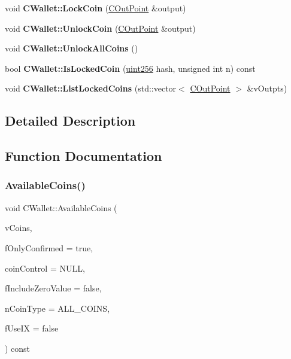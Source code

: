 \begin{DoxyCompactItemize}
void {\bfseries C\+Wallet\+::\+Lock\+Coin} (\mbox{\hyperlink{class_c_out_point}{C\+Out\+Point}} \&output)
\item 
\mbox{\label{group___actions_gabd60f5b890e2c62c05c6a2de6322197f}} 
void {\bfseries C\+Wallet\+::\+Unlock\+Coin} (\mbox{\hyperlink{class_c_out_point}{C\+Out\+Point}} \&output)
\item 
\mbox{\label{group___actions_gab51d80d53bc30799dd6888868a553963}} 
void {\bfseries C\+Wallet\+::\+Unlock\+All\+Coins} ()
\item 
\mbox{\label{group___actions_ga58abc6e61537f10bfb9429587ed29074}} 
bool {\bfseries C\+Wallet\+::\+Is\+Locked\+Coin} (\mbox{\hyperlink{classuint256}{uint256}} hash, unsigned int n) const
\item 
\mbox{\label{group___actions_ga41f4c77a0843692388f8b11d5fb88042}} 
void {\bfseries C\+Wallet\+::\+List\+Locked\+Coins} (std\+::vector$<$ \mbox{\hyperlink{class_c_out_point}{C\+Out\+Point}} $>$ \&v\+Outpts)
\end{DoxyCompactItemize}


\subsection{Detailed Description}


\subsection{Function Documentation}
\mbox{\label{group___actions_ga8110e889be0f5915104e07bfe3839c68}} 
\subsubsection{\texorpdfstring{AvailableCoins()}{AvailableCoins()}}
{\footnotesize\ttfamily void C\+Wallet\+::\+Available\+Coins (\begin{DoxyParamCaption}\item[{std\+::vector$<$ \mbox{\hyperlink{class_c_output}{C\+Output}} $>$ \&}]{v\+Coins,  }\item[{bool}]{f\+Only\+Confirmed = {\ttfamily true},  }\item[{const \mbox{\hyperlink{class_c_coin_control}{C\+Coin\+Control}} $\ast$}]{coin\+Control = {\ttfamily NULL},  }\item[{bool}]{f\+Include\+Zero\+Value = {\ttfamily false},  }\item[{Available\+Coins\+Type}]{n\+Coin\+Type = {\ttfamily ALL\+\_\+COINS},  }\item[{bool}]{f\+Use\+IX = {\ttfamily false} }\end{DoxyParamCaption}) const}


